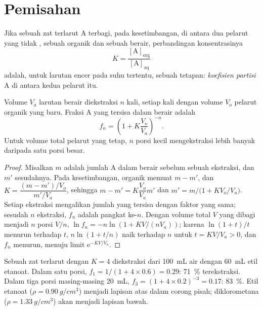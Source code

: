 \section{Pemisahan}

\begin{definition}\label{def:b1:lab-techniques-1:partition-coefficient}
Jika sebuah zat terlarut A terbagi, pada kesetimbangan, di antara dua
pelarut yang tidak , sebuah  organik dan sebuah 
berair, perbandingan konsentrasinya
\[
  K = \frac{[\mathrm{A}]_{\mathrm{org}}}{[\mathrm{A}]_{\mathrm{aq}}}
\]
adalah, untuk larutan encer pada suhu tertentu, sebuah tetapan:
\emph{koefisien partisi} A di antara kedua
pelarut itu.
\end{definition}

\begin{proposition}\label{prop:b1:lab-techniques-1:multiple-extractions}
Volume $V_a$ larutan berair diekstraksi $n$ kali, setiap kali dengan
volume $V_o$ pelarut organik yang baru. Fraksi A yang tersisa dalam 
berair adalah
\[
  f_n = \left(1 + K \frac{V_o}{V_a}\right)^{-n}.
\]
Untuk volume total pelarut yang tetap, $n$ porsi kecil mengekstraksi
lebih banyak daripada satu porsi besar.
\end{proposition}
\begin{proof}
Misalkan $m$ adalah jumlah A dalam  berair sebelum sebuah ekstraksi,
dan
$m'$ sesudahnya. Pada kesetimbangan,  organik memuat $m - m'$, dan
$K = \dfrac{(m - m')/V_o}{m'/V_a}$, sehingga $m - m' = K\dfrac{V_o}{V_a} m'$ dan
$m' = m\big/\bigl(1 + K V_o/V_a\bigr)$. Setiap ekstraksi mengalikan
jumlah yang tersisa dengan faktor yang sama; sesudah $n$ ekstraksi, $f_n$
adalah pangkat ke-$n$. Dengan volume total $V$ yang dibagi menjadi $n$
porsi $V/n$,
$\ln f_n = -n \ln(1 + KV/(nV_a))$; karena $\ln(1+t)/t$ menurun terhadap $t$,
$n \ln(1 + t/n)$ naik terhadap $n$ untuk $t = KV/V_a > 0$, dan $f_n$
menurun, menuju limit $\mathrm{e}^{-KV/V_a}$.
\end{proof}

\begin{example}
Sebuah zat terlarut dengan $K = 4$ diekstraksi dari \qty{100}{mL} air
dengan \qty{60}{mL} etil etanoat. Dalam satu porsi,
$f_1 = 1/(1 + 4 \times 0.6) = 0.29$: \qty{71}{\percent} terekstraksi.
Dalam tiga porsi masing-masing \qty{20}{mL}, $f_3 = (1 + 4 \times 0.2)^{-3} = 0.17$:
\qty{83}{\percent}. Etil etanoat ($\rho = \qty{0.90}{g/cm^3}$) menjadi
lapisan atas dalam corong pisah; diklorometana
($\rho = \qty{1.33}{g/cm^3}$) akan menjadi lapisan bawah.
\end{example}

